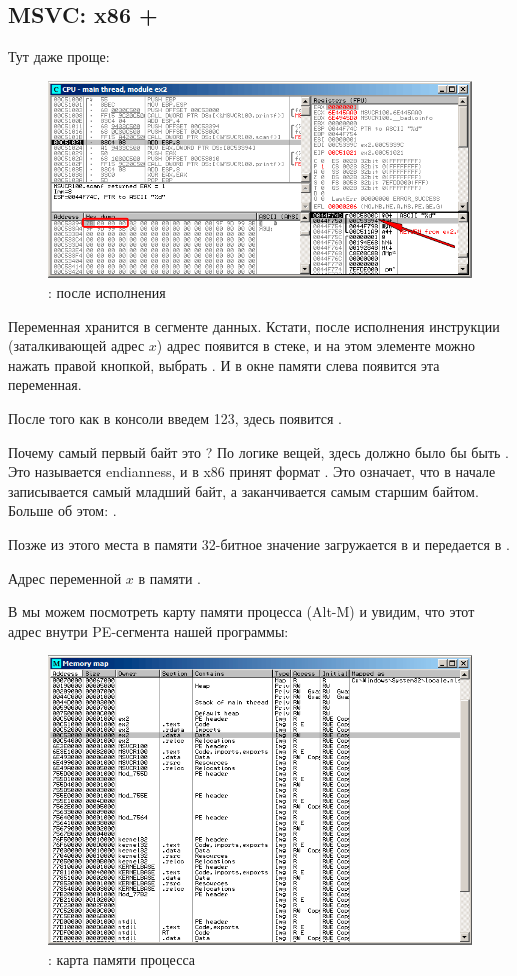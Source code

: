 \clearpage
\subsection{MSVC: x86 + \olly}
\myindex{\olly}

Тут даже проще:

\begin{figure}[H]
\centering
\includegraphics[scale=\FigScale]{patterns/04_scanf/2_global/ex2_olly_1.png}
\caption{\olly: после исполнения \scanf}
\label{fig:scanf_ex2_olly_1}
\end{figure}

Переменная хранится в сегменте данных.
Кстати, после исполнения инструкции \PUSH (заталкивающей адрес $x$) адрес появится в стеке, 
и на этом элементе можно нажать правой кнопкой, выбрать .
И в окне памяти слева появится эта переменная.

После того как в консоли введем 123, здесь появится .

Почему самый первый байт это ?
По логике вещей, здесь должно было бы быть .
Это называется \gls{endianness}, и в x86 принят формат .
Это означает, что в начале записывается самый младший байт, а заканчивается самым старшим байтом.
Больше об этом: .

Позже из этого места в памяти 32-битное значение загружается в \EAX и передается в \printf.

Адрес переменной $x$ в памяти .

\clearpage
В \olly{} мы можем посмотреть карту памяти процесса (Alt-M) и увидим, что этот адрес
внутри PE-сегмента  нашей программы:

\begin{figure}[H]
\centering
\includegraphics[scale=\FigScale]{patterns/04_scanf/2_global/ex2_olly_2.png}
\caption{\olly: карта памяти процесса}
\label{fig:scanf_ex2_olly_2}
\end{figure}
